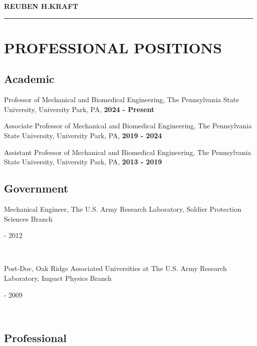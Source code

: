 \documentclass[a4paper,10pt]{article}
\author{}
\date{}
\begin{document}
    \begin{center}
    \LARGE \textbf{\textsc{REUBEN H.KRAFT}} \\
    \rule{\linewidth}{2pt}
    \end{center}
    \normalsize %
    


    \section*{PROFESSIONAL POSITIONS}
    
    \subsection*{Academic}
    
                \noindent Professor of Mechanical and Biomedical Engineering, The Pennsylvania State University, University Park, PA, \textbf{2024 - Present}\vspace{0.25cm}
                
                \noindent Associate Professor of Mechanical and Biomedical Engineering, The Pennsylvania State University, University Park, PA, \textbf{2019 - 2024}\vspace{0.25cm}
                
                \noindent Assistant Professor of Mechanical and Biomedical Engineering, The Pennsylvania State University, University Park, PA, \textbf{2013 - 2019}\vspace{0.25cm}
                
    \subsection*{Government}
    
                \noindent \parbox[t]{0.8\linewidth}{\raggedright Mechanical Engineer, The U.S. Army Research Laboratory, Soldier Protection Sciences Branch} \hfill \parbox[t]{0.2\linewidth}{ - 2012} \\
                
                \noindent \parbox[t]{0.8\linewidth}{\raggedright Post-Doc, Oak Ridge Associated Universities at The U.S. Army Research Laboratory, Impact Physics Branch} \hfill \parbox[t]{0.2\linewidth}{ - 2009} \\
                
    \subsection*{Professional}
    
\end{document}
